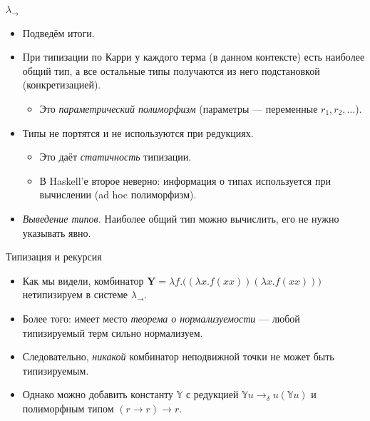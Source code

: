 \documentclass[xcolor=dvipsnames]{beamer}
\newcommand{\Yx}{\mathbf{Y}}
\newcommand{\Yb}{\mathbb{Y}}
\begin{document}
\begin{frame}{$\lambda_\to$}

\begin{itemize}[<+->]
 \item Подведём итоги.
 \item При типизации по Карри у каждого терма (в данном контексте) есть наиболее общий тип, а все остальные типы получаются из него подстановкой (конкретизацией).
 \begin{itemize}
  \item Это {\em параметрический полиморфизм} (параметры --- переменные $r_1, r_2, \ldots$).
 \end{itemize}
 \item Типы не портятся и не используются при редукциях.
 \begin{itemize}
  \item Это даёт {\em статичность} типизации.
  \item В Haskell'е второе неверно: информация о типах используется при вычислении (ad hoc полиморфизм).
 \end{itemize}
\item {\em Выведение типов.} Наиболее общий тип можно вычислить, его не нужно указывать явно.
\end{itemize}

 
\end{frame}


\begin{frame}{Типизация и рекурсия}
 
 \begin{itemize}[<+->]
  \item Как мы видели, комбинатор $\Yx = \lambda f. \bigl( (\lambda x. f(xx)) (\lambda x. f(xx)) \bigr)$ нетипизируем в системе $\lambda_\to$.
  \item Более того: имеет место {\em теорема о нормализуемости} --- любой типизируемый терм сильно нормализуем.
  \item Следовательно, {\em никакой} комбинатор неподвижной точки не может быть типизируемым.
  \item Однако можно добавить константу $\Yb$ с редукцией $\Yb u \to_\delta u(\Yb u)$ и полиморфным типом $(r\to r) \to r$.
 \end{itemize}

 
\end{frame}
\end{document}
